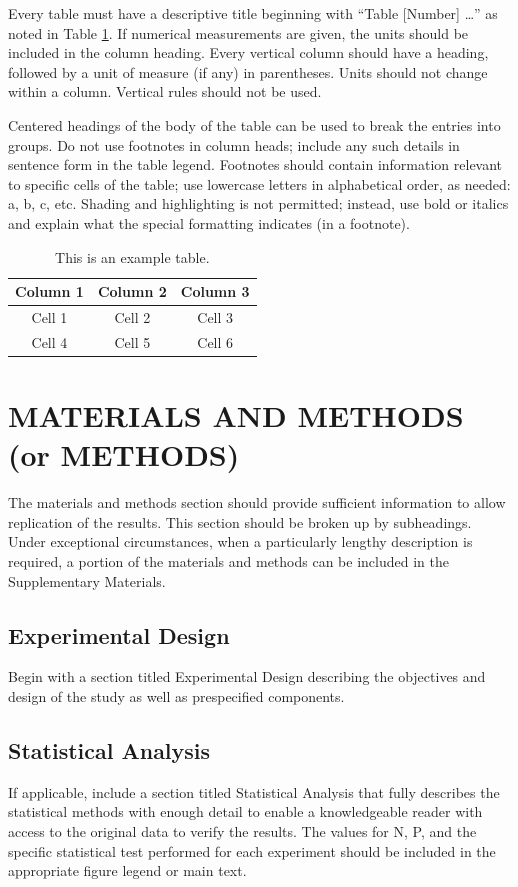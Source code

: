 \documentclass{article}
\begin{document}
Every table must have a descriptive title beginning with ``Table [Number] …'' as noted in Table \ref{tab:1}. If numerical measurements are given, the units should be included in the column heading. Every vertical column should have a heading, followed by a unit of measure (if any) in parentheses. Units should not change within a column. Vertical rules should not be used. 

Centered headings of the body of the table can be used to break the entries into groups. Do not use footnotes in column heads; include any such details in sentence form in the table legend. Footnotes should contain information relevant to specific cells of the table; use lowercase letters in alphabetical order, as needed: a, b, c, etc. Shading and highlighting is not permitted; instead, use bold or italics and explain what the special formatting indicates (in a footnote).

\begin{table}[b]
    \caption{This is an example table.}    
    \centering
    \begin{tabular}{ccc}
            \hline
            Column 1 & Column 2 & Column 3 \\  
            \hline
            Cell 1 & Cell 2 & Cell 3\\ 
            Cell 4 & Cell 5 & Cell 6 \\
            \hline
            \end{tabular}

    \label{tab:1}
\end{table}

\section{MATERIALS AND METHODS (or METHODS)}
The materials and methods section should provide sufficient information to allow replication of the results. This section should be broken up by subheadings. Under exceptional circumstances, when a particularly lengthy description is required, a portion of the materials and methods can be included in the Supplementary Materials. 

\subsection{Experimental Design}
Begin with a section titled Experimental Design describing the objectives and design of the study as well as prespecified components. 

\subsection{Statistical Analysis}
If applicable, include a section titled Statistical Analysis that fully describes the statistical methods with enough detail to enable a knowledgeable reader with access to the original data to verify the results. The values for N, P, and the specific statistical test performed for each experiment should be included in the appropriate figure legend or main text. 
\end{document}
